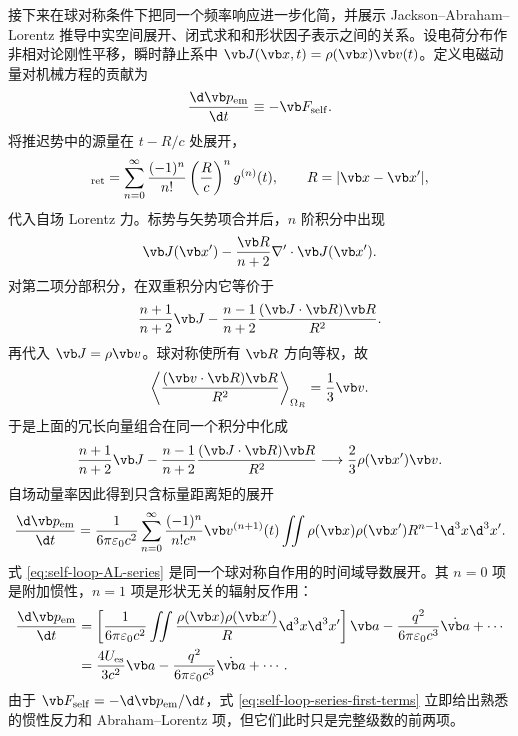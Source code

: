 接下来在球对称条件下把同一个频率响应进一步化简，并展示 Jackson--Abraham--Lorentz 推导中实空间展开、闭式求和和形状因子表示之间的关系。设电荷分布作非相对论刚性平移，瞬时静止系中 $\vb J(\vb x,t)=\rho(\vb x)\vb v(t)$。定义电磁动量对机械方程的贡献为
\begin{equation*}
 {\d\vb p_{\mathrm{em}}\over\d t}
 \equiv-\vb F_{\mathrm{self}}.
\end{equation*}
将推迟势中的源量在 $t-R/c$ 处展开，
\begin{equation*}
 [g]_{\mathrm{ret}}
 =\sum_{n=0}^\infty{(-1)^n\over n!}
 \left({R\over c}\right)^n g^{(n)}(t),
 \qquad R=|\vb x-\vb x'|,
\end{equation*}
代入自场 Lorentz 力。标势与矢势项合并后，$n$ 阶积分中出现
\begin{equation*}
 \vb J(\vb x')-{\vb R\over n+2}\nabla'\cdot\vb J(\vb x').
\end{equation*}
对第二项分部积分，在双重积分内它等价于
\begin{equation*}
 {n+1\over n+2}\vb J
 -{n-1\over n+2}{(\vb J\cdot\vb R)\vb R\over R^2}.
\end{equation*}
再代入 $\vb J=\rho\vb v$。球对称使所有 $\vb R$ 方向等权，故
\begin{equation*}
 \left\langle{(\vb v\cdot\vb R)\vb R\over R^2}\right\rangle_{\Omega_R}
 ={1\over3}\vb v.
\end{equation*}
于是上面的冗长向量组合在同一个积分中化成
\begin{equation*}
 {n+1\over n+2}\vb J
 -{n-1\over n+2}{(\vb J\cdot\vb R)\vb R\over R^2}
 \longrightarrow {2\over3}\rho(\vb x')\vb v.
\end{equation*}
自场动量率因此得到只含标量距离矩的展开
\begin{equation}
 {\d\vb p_{\mathrm{em}}\over\d t}
 ={1\over6\pi\varepsilon_0c^2}
 \sum_{n=0}^\infty{(-1)^n\over n!c^n}
 \vb v^{(n+1)}(t)
 \iint\rho(\vb x)\rho(\vb x')R^{n-1}\d^3x\d^3x'.
 \label{eq:self-loop-AL-series}
\end{equation}
式 \eqref{eq:self-loop-AL-series} 是同一个球对称自作用的时间域导数展开。其 $n=0$ 项是附加惯性，$n=1$ 项是形状无关的辐射反作用：
\begin{align}
 {\d\vb p_{\mathrm{em}}\over\d t}
 &=\left[{1\over6\pi\varepsilon_0c^2}
 \iint{\rho(\vb x)\rho(\vb x')\over R}\d^3x\d^3x'\right]\vb a
 -{q^2\over6\pi\varepsilon_0c^3}\dot{\vb a}+\cdots
 \notag\\
 &={4U_{\mathrm{es}}\over3c^2}\vb a
 -{q^2\over6\pi\varepsilon_0c^3}\dot{\vb a}+\cdots.
 \label{eq:self-loop-series-first-terms}
\end{align}
由于 $\vb F_{\mathrm{self}}=-\d\vb p_{\mathrm{em}}/\d t$，式 \eqref{eq:self-loop-series-first-terms} 立即给出熟悉的惯性反力和 Abraham--Lorentz 项，但它们此时只是完整级数的前两项。

